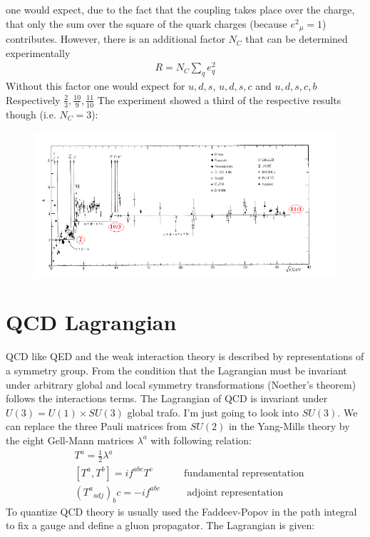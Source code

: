 one would expect, due to the fact that the coupling takes place over the charge, that only the sum over the square of the quark charges (because $  {e^2}_\mu= 1$) contributes. However, there is an additional factor $N_C$ that can be determined experimentally
\begin{equation}
\begin{split}
R = N_C \sum_q e^2_q
\end{split}
\end{equation}
Without this factor one would expect for $ u, d, s $, $ u, d, s, c $ and $ u, d, s, c, b $ Respectively $ \frac{2}{3}, \frac{10}{9}, \frac{11}{10} $ The experiment showed a third of the respective results though (i.e. $ N_C =3 $):

\begin{figure}[h!]
\centering
\includegraphics[scale=0.6]{images/Intro/Ratio.png}
\cite{Eva}
\end{figure}
\section{QCD Lagrangian}

QCD like QED and the weak interaction theory is described by representations of a symmetry group. From the condition that the Lagrangian must be invariant under arbitrary global and local symmetry transformations (Noether’s theorem) follows the interactions terms.
The Lagrangian of QCD is invariant under $ U(3) = U(1) \times SU(3) $ global trafo. I'm just going to look into $ SU(3) $. We can replace the three Pauli matrices from $ SU(2) $ in the Yang-Mills theory by the eight Gell-Mann matrices $ {\lambda}^a $ with following relation:
\begin{equation}
\begin{split}
&T^a = \frac{1}{2} \lambda^a\\
&[T^a, T^b]= if^{abc} T^c \:\:\:\:\:\:\:\:\:\:\:\:\:\:\text{fundamental representation}\\
&({T^a}_{adj})_bc = -if^{abc} \:\:\:\:\:\:\:\:\:\:\:\:\text{adjoint representation}
\end{split}
\end{equation}
To quantize QCD theory is usually used the Faddeev-Popov in the path integral to fix a gauge and define a gluon propagator. The Lagrangian is given:


